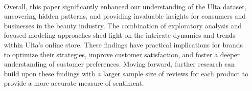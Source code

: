 \documentclass[10pt]{article}
\begin{document}
\

Overall, this paper significantly enhanced our understanding of the Ulta dataset, uncovering hidden patterns, and providing invaluable insights for consumers and businesses in the beauty industry. The combination of exploratory analysis and focused modeling approaches shed light on the intricate dynamics and trends within Ulta's online store. These findings have practical implications for brands to optimize their strategies, improve customer satisfaction, and foster a deeper understanding of customer preferences. Moving forward, further research can build upon these findings with a larger sample size of reviews for each product to provide a more accurate measure of sentiment.
\end{document}
